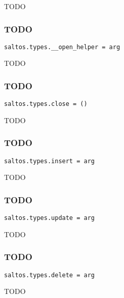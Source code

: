 \documentclass[a4paper]{article}
\begin{document}
TODO

\hypertarget{toc137}{}
\subsubsection{TODO}

\begin{lstlisting}
saltos.types.__open_helper = arg
\end{lstlisting}

TODO

\hypertarget{toc138}{}
\subsubsection{TODO}

\begin{lstlisting}
saltos.types.close = ()
\end{lstlisting}

TODO

\hypertarget{toc139}{}
\subsubsection{TODO}

\begin{lstlisting}
saltos.types.insert = arg
\end{lstlisting}

TODO

\hypertarget{toc140}{}
\subsubsection{TODO}

\begin{lstlisting}
saltos.types.update = arg
\end{lstlisting}

TODO

\hypertarget{toc141}{}
\subsubsection{TODO}

\begin{lstlisting}
saltos.types.delete = arg
\end{lstlisting}

TODO

\end{document}
